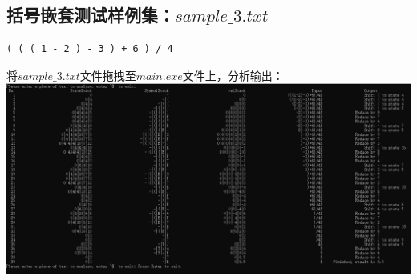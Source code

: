 \documentclass[UTF8]{ctexart}
\begin{document}
\subsection{括号嵌套测试样例集：$sample\_3.txt$}
\begin{lstlisting}
( ( ( 1 - 2 ) - 3 ) + 6 ) / 4

    \end{lstlisting}
将$sample\_3.txt$文件拖拽至$main.exe$文件上，分析输出： \\
\includegraphics[width=\textwidth]{sample_3}
\end{document}
